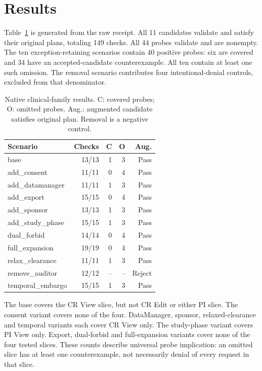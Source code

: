 \documentclass[sigconf,nonacm]{acmart}
\begin{document}
\section{Results}
Table~\ref{tab:results} is generated from the raw receipt. All 11 candidates validate and satisfy their original plans, totaling 149 checks. All 44 probes validate and are nonempty. The ten exception-retaining scenarios contain 40 positive probes: six are covered and 34 have an accepted-candidate counterexample. All ten contain at least one such omission. The removal scenario contributes four intentional-denial controls, excluded from that denominator.

\begin{table}[t]
\centering\small\setlength{\tabcolsep}{3pt}
\caption{Native clinical-family results. C: covered probes; O: omitted probes. Aug.: augmented candidate satisfies original plan. Removal is a negative control.}
\label{tab:results}
\begin{tabular}{lrrrr}
\toprule Scenario & Checks & C & O & Aug.\\\midrule
base & 13/13 & 1 & 3 & Pass \\
add\_consent & 11/11 & 0 & 4 & Pass \\
add\_datamanager & 11/11 & 1 & 3 & Pass \\
add\_export & 15/15 & 0 & 4 & Pass \\
add\_sponsor & 13/13 & 1 & 3 & Pass \\
add\_study\_phase & 15/15 & 1 & 3 & Pass \\
dual\_forbid & 14/14 & 0 & 4 & Pass \\
full\_expansion & 19/19 & 0 & 4 & Pass \\
relax\_clearance & 11/11 & 1 & 3 & Pass \\
remove\_auditor & 12/12 & -- & -- & Reject \\
temporal\_embargo & 15/15 & 1 & 3 & Pass \\
\bottomrule\end{tabular}
\end{table}

The base covers the CR View slice, but not CR Edit or either PI slice. The consent variant covers none of the four. DataManager, sponsor, relaxed-clearance and temporal variants each cover CR View only. The study-phase variant covers PI View only. Export, dual-forbid and full-expansion variants cover none of the four tested slices. These counts describe universal probe implication: an omitted slice has at least one counterexample, not necessarily denial of every request in that slice.
\end{document}
